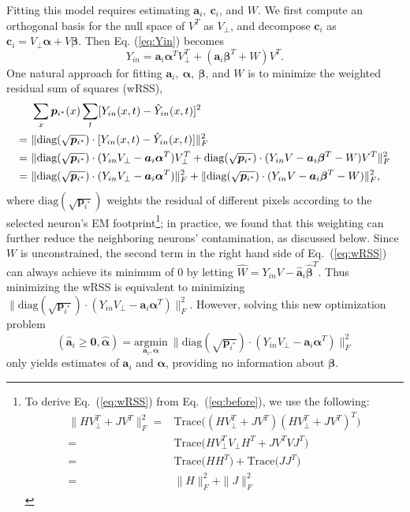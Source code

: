 \documentclass[10pt,letterpaper]{article}
\begin{document}
{Fitting this model requires estimating $\bm{a}_i,~ \bm{c}_i$, and $W$.  We first compute an orthogonal basis for the null space of $V^T$ as $V_{\perp}$, and decompose $\bm{c}_i$ as $\bm{c}_i = V_\perp\bm{\alpha}  +  V\bm{\beta}$. Then Eq. (\ref{eq:Yin}) becomes 
\begin{equation}
	Y_{in} = \bm{a}_i\bm{\alpha}^TV_\perp^T + (\bm{a}_i\bm{\beta}^T + W)V^T.
\end{equation}
One natural approach for fitting $\bm{a}_i, ~\bm{\alpha}, ~\bm{\beta}$, and $W$ is to minimize the weighted residual sum of squares (wRSS),
\begin{align}
	&\sum_x \bm{p}_{i^*}(x) \sum_t [Y_{in}(x,t) - \hat Y_{in}(x,t)]^2 \notag\\%
	 = ~ & \|\text{diag}(\sqrt{\bm{p}_{i^*}})\cdot [Y_{in}(x,t) - \hat Y_{in}(x,t)]\|_F^2 \notag\\%
	 = ~ &\|\text{diag}(\sqrt{\bm{p}_{i^*}})\cdot(Y_{in}V_\perp - \bm{a}_i\bm{\alpha}^T)V_{\perp}^T +\text{diag}(\sqrt{\bm{p}_{i^*}}) \cdot (Y_{in}V - \bm{a}_i\bm{\beta}^ T-W)V^T\|_F^2 \label{eq:before}\\
	 = ~ &\|\text{diag}(\sqrt{\bm{p}_{i^*}})\cdot(Y_{in}V_\perp - \bm{a}_i\bm{\alpha}^T)\|_F^2 + \|\text{diag}(\sqrt{\bm{p}_{i^*}})\cdot(Y_{in}V - \bm{a}_i\bm{\beta}^ T-W)\|_F^2,  \label{eq:wRSS}
\end{align}
where $\text{diag}(\sqrt{\bm{p}_{i^*}})$ weights the residual of different pixels according to the selected neuron's EM footprint\footnote{ To derive Eq.~(\ref{eq:wRSS}) from Eq.~(\ref{eq:before}), we  use the following: 
\begin{align*}
\|HV_\perp^T + JV^T\|_F^2 = & \text{Trace}\Big((HV_\perp^T + JV^T)(HV_\perp^T + JV^T)^T \Big)\\
= & \text{Trace}\Big(HV_\perp^TV_\perp H^T  + JV^TVJ^T \Big)\\
= & \text{Trace}\Big(HH^T\Big) + \text{Trace}\Big( JJ^T \Big)\\
= & \|H\|_F^2 + \|J\|_F^2
\end{align*}}; in practice, we found that this weighting can further reduce the neighboring neurons' contamination, as discussed below. 
Since $W$ is unconstrained, the second term in the right hand side of Eq.~(\ref{eq:wRSS}) can always achieve its minimum of $0$ by letting $\hat{W}=Y_{in}V - \hat{\bm{a}}_i\hat{\bm\beta}^T$. Thus minimizing the wRSS is equivalent to minimizing $\|\text{diag}(\sqrt{\bm{p}_{i^*}})\cdot(Y_{in}V_\perp - \bm{a}_i\bm{\alpha}^T)\|_F^2 $. However, solving this new optimization problem
\begin{equation}
 	(\hat{\bm{a}}_i\geq \bm{0}, \hat{\bm{\alpha}}) = \underset{\bm{a}_i, \bm{\alpha}}{\text{argmin}} ~ \|\text{diag}(\sqrt{\bm{p}_{i^*}})\cdot (Y_{in}V_\perp - \bm{a}_i\bm{\alpha}^T)\|_F^2 \label{eq:aalpha}
 \end{equation} only yields estimates of $\bm{a}_i$ and $\bm{\alpha}$, providing no information about $\bm{\beta}$. 

}
\end{document}
